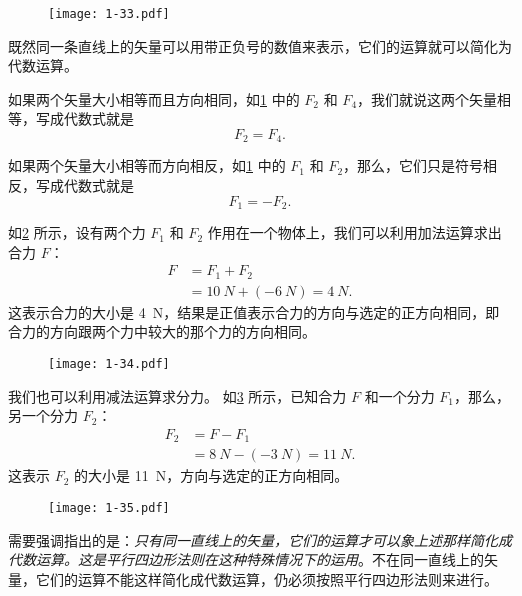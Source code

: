 \begin{figure}
  \texttt{[image: 1-33.pdf]}
  \caption{}\label{fig:1-33}
\end{figure}

既然同一条直线上的矢量可以用带正负号的数值来表示，它们的运算就可以简化为代数运算。

如果两个矢量大小相等而且方向相同，如\cref{fig:1-33} 中的 $F_2$ 和 $F_4$，我们就说这两个矢量相等，写成代数式就是
\begin{equation}
F_2=F_4.
\end{equation}

如果两个矢量大小相等而方向相反，如\cref{fig:1-33} 中的 $F_1$ 和 $F_2$，那么，它们只是符号相反，写成代数式就是
\begin{equation}
F_1=-F_2.
\end{equation}

如\cref{fig:1-34} 所示，设有两个力 $F_1$ 和 $F_2$ 作用在一个物体上，我们可以利用加法运算求出合力 $F$：
\begin{equation}
  \label{eq:resultant_force}
\begin{split}
F&=F_1+F_2\\
&=\qty{10}{N}+(\qty{-6}{N})=\qty{4}{N}.
\end{split}
\end{equation}
这表示合力的大小是 \qty{4}{N}，结果是正值表示合力的方向与选定的正方向相同，即合力的方向跟两个力中较大的那个力的方向相同。

\begin{figure}
  \texttt{[image: 1-34.pdf]}
  \caption{}\label{fig:1-34}
\end{figure}

我们也可以利用减法运算求分力。
如\cref{fig:1-35} 所示，已知合力 $F$ 和一个分力 $F_1$，那么，另一个分力 $F_2$：
\begin{equation}
\begin{split}
F_2&=F-F_1\\
&=\qty{8}{N}-(\qty{-3}{N})=\qty{11}{N}.
\end{split}
\end{equation}
这表示 $F_2$ 的大小是 \qty{11}{N}，方向与选定的正方向相同。

\begin{figure}
  \texttt{[image: 1-35.pdf]}
  \caption{}\label{fig:1-35}
\end{figure}

需要强调指出的是：\emph{只有同一直线上的矢量，它们的运算才可以象上述那样简化成代数运算。这是平行四边形法则在这种特殊情况下的运用}。不在同一直线上的矢量，它们的运算不能这样简化成代数运算，仍必须按照平行四边形法则来进行。

